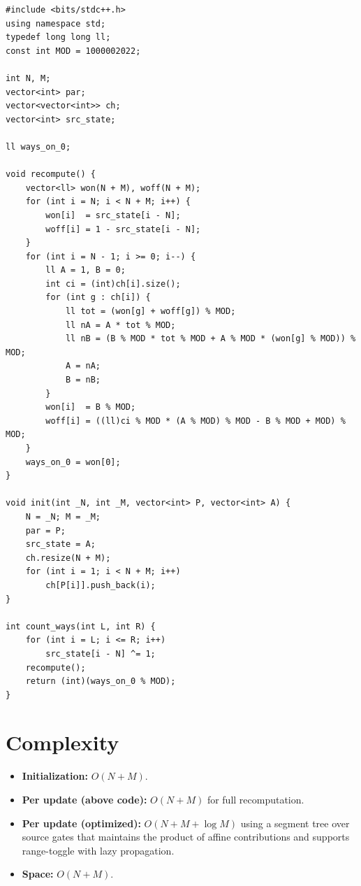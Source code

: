 \documentclass[11pt,a4paper]{article}
\begin{document}
\begin{lstlisting}
#include <bits/stdc++.h>
using namespace std;
typedef long long ll;
const int MOD = 1000002022;

int N, M;
vector<int> par;
vector<vector<int>> ch;
vector<int> src_state;

ll ways_on_0;

void recompute() {
    vector<ll> won(N + M), woff(N + M);
    for (int i = N; i < N + M; i++) {
        won[i]  = src_state[i - N];
        woff[i] = 1 - src_state[i - N];
    }
    for (int i = N - 1; i >= 0; i--) {
        ll A = 1, B = 0;
        int ci = (int)ch[i].size();
        for (int g : ch[i]) {
            ll tot = (won[g] + woff[g]) % MOD;
            ll nA = A * tot % MOD;
            ll nB = (B % MOD * tot % MOD + A % MOD * (won[g] % MOD)) % MOD;
            A = nA;
            B = nB;
        }
        won[i]  = B % MOD;
        woff[i] = ((ll)ci % MOD * (A % MOD) % MOD - B % MOD + MOD) % MOD;
    }
    ways_on_0 = won[0];
}

void init(int _N, int _M, vector<int> P, vector<int> A) {
    N = _N; M = _M;
    par = P;
    src_state = A;
    ch.resize(N + M);
    for (int i = 1; i < N + M; i++)
        ch[P[i]].push_back(i);
}

int count_ways(int L, int R) {
    for (int i = L; i <= R; i++)
        src_state[i - N] ^= 1;
    recompute();
    return (int)(ways_on_0 % MOD);
}
\end{lstlisting}

\section{Complexity}

\begin{itemize}
  \item \textbf{Initialization:} $O(N + M)$.
  \item \textbf{Per update (above code):} $O(N + M)$ for full recomputation.
  \item \textbf{Per update (optimized):} $O(N + M + \log M)$ using a segment
        tree over source gates that maintains the product of affine
        contributions and supports range-toggle with lazy propagation.
  \item \textbf{Space:} $O(N + M)$.
\end{itemize}
\end{document}
